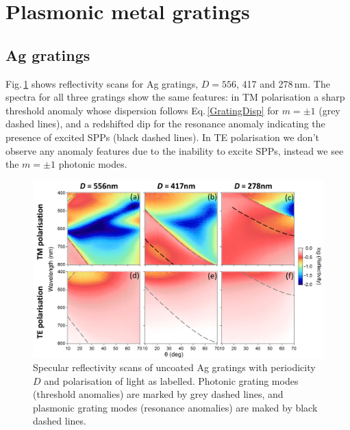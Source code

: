\section{Plasmonic metal gratings}

\subsection{Ag gratings}
Fig.\,\ref{7Fig7} shows reflectivity scans for Ag gratings, $D=556$, 417 and 278\,nm. The spectra for all three gratings show the same features: in TM polarisation a sharp threshold anomaly whose dispersion follows Eq.\,\ref{GratingDisp} for $m=\pm1$ (grey dashed lines), and a redshifted dip for the resonance anomaly indicating the presence of excited SPPs (black dashed lines). In TE polarisation we don't observe any anomaly features due to the inability to excite SPPs, instead we see the $m=\pm1$ photonic modes.
\begin{figure}[h!] 
\centering    
\includegraphics[width=\textwidth]{Fig7}
\caption[TM and TE specular reflectivity scans of uncoated Ag gratings, $D=556$, 417 and 278\,nm.]{Specular reflectivity scans of uncoated Ag gratings with periodicity $D$ and polarisation of light as labelled. Photonic grating modes (threshold anomalies) are marked by grey dashed lines, and plasmonic grating modes (resonance anomalies) are maked by black dashed lines.}
\label{7Fig7}
\end{figure}

